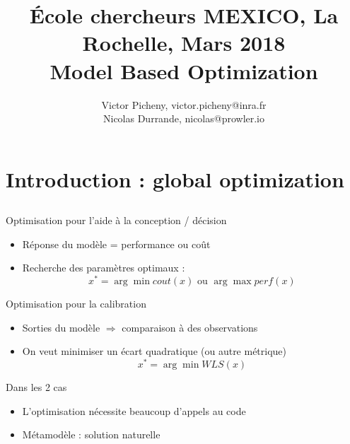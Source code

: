 \documentclass{beamer}
\title[\'Ecole chercheurs MEXICO]{ \small \'Ecole chercheurs MEXICO, La Rochelle, Mars 2018\\ \vspace{3mm} \LARGE Model Based Optimization}
\author[\quad La Rochelle, March 2018]{Victor Picheny, victor.picheny@inra.fr \\ Nicolas Durrande, nicolas@prowler.io}
\date{\null}
\begin{document}
\begin{frame}
  \titlepage
\end{frame}


\section[Global optim.]{Introduction : global optimization}
\subsection{}

\begin{frame}{}
\begin{block}{Optimisation pour l'aide à la conception / décision}
 \begin{itemize}
  \item Réponse du modèle = performance ou coût
  \item Recherche des paramètres optimaux :
  $$x^* = \arg \min cout(x) \text{ ou } \arg \max {perf(x)}$$
   \end{itemize}
\end{block}

\begin{exampleblock}{Optimisation pour la calibration}
 \begin{itemize}
  \item Sorties du modèle $\Rightarrow$ comparaison à des observations
  \item On veut minimiser un écart quadratique (ou autre métrique)
  $$x^* = \arg \min WLS(x)$$
  \end{itemize}
\end{exampleblock}

\begin{alertblock}{Dans les 2 cas}
 \begin{itemize}
  \item L'optimisation nécessite beaucoup d'appels au code
  \item Métamodèle : solution naturelle
 \end{itemize}
\end{alertblock}

\end{frame}
\end{document}
